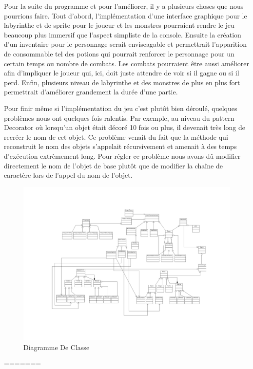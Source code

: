 \documentclass[a4paper]{article}
\begin{document}
Pour la suite du programme et pour l'améliorer, il y a plusieurs choses que nous pourrions faire.
Tout d'abord, l'implémentation d'une interface graphique pour le labyrinthe et de sprite pour le joueur et les monstres pourraient rendre le jeu beaucoup plus immersif
que l'aspect simpliste de la console. Ensuite la création d'un inventaire pour le personnage serait enviseagable et permettrait l'apparition de consommable tel des potions
qui pourrait renforcer le personnage pour un certain temps ou nombre de combats.
Les combats pourraient être aussi améliorer afin d'impliquer le joueur qui, ici, doit juste attendre de voir si il gagne ou si il perd.
Enfin, plusieurs niveau de labyrinthe et des monstres de plus en plus fort permettrait d'améliorer grandement la durée d'une partie.

Pour finir même si l'implémentation du jeu c'est plutôt bien déroulé, quelques problèmes nous ont quelques fois ralentis. Par exemple, au niveau du pattern Decorator
où lorsqu'un objet était décoré 10 fois ou plus, il devenait très long de recréer le nom de cet objet. Ce problème venait du fait que la méthode qui reconstruit le nom
des objets s'appelait récursivement et amenait à des temps d'exécution extrèmement long. Pour régler ce problème nous avons dû modifier directement le nom de l'objet de
base plutôt que de modifier la chaîne de caractère lors de l'appel du nom de l'objet.

\begin{figure}[h]
			\centering
				\includegraphics[angle=90,width=20cm]{./diagClasse.png}
			\caption{\label{fig:Diag}Diagramme De Classe}
			
		\end{figure}
=======
  \maketitle{}
  \thispagestyle{empty}
  \newpage
  \tableofcontents{}
  \newpage
\end{document}
